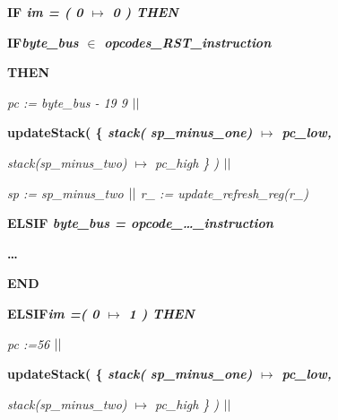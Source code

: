 \documentclass[11pt]{article} %
\begin{document}
\begin{sloppypar}

\hspace*{0.00in}\bf IF \it im \rm = \rm ( \rm 0  $\mapsto$  \rm 0 \rm ) \bf THEN  

\hspace*{0.10in}\bf IF\hspace*{0.10in}\it byte\_bus \rm $\in$  \it opcodes\_RST\_instruction

\hspace*{0.10in}\bf THEN\hspace*{1.05in}

\hspace*{0.40in}\it pc \rm := \it byte\_bus \rm - \rm 1\rm 9\rm
9\hspace*{0.10in} $\mbox{$\mid\mid$}$

\hspace*{0.40in}\bf updateStack\rm ( \rm \{ \it stack\rm ( \it
sp\_minus\_one\rm )  $\mapsto$  \it pc\_low\rm ,

\hspace*{0.40in}\it stack\rm (\it sp\_minus\_two\rm )  $\mapsto$  \it pc\_high
\rm \} \rm )  $\mbox{$\mid\mid$}$

\hspace*{0.40in}\it sp \rm := \it sp\_minus\_two  $\mbox{$\mid\mid$}$ \hspace*{0.10in}\it
r\_ \rm := \it update\_refresh\_reg\rm (\it r\_\rm )

\hspace*{0.10in}\bf ELSIF \it byte\_bus \rm = \it opcode\_\ldots\_instruction

\hspace*{0.40in}\bf \ldots 

\hspace*{0.10in}\bf END

\hspace*{0.00in}\bf ELSIF\hspace*{0.10in}\it im \rm =\hspace*{0.10in}\rm ( \rm
0  $\mapsto$  \rm 1 \rm ) \bf THEN

\hspace*{0.10in}\it pc \rm :=\hspace*{0.10in}\rm 5\rm 6  \hspace*{0.80in}
$\mbox{$\mid\mid$}$

\hspace*{0.10in}\bf updateStack\rm ( \rm \{ \it stack\rm (\it
sp\_minus\_one\rm )  $\mapsto$  \it pc\_low\rm ,

\hspace*{0.10in}\it stack\rm (\it sp\_minus\_two\rm )  $\mapsto$  \it pc\_high
\rm \} \rm )  $\mbox{$\mid\mid$}$


\end{sloppypar}
\end{document}
